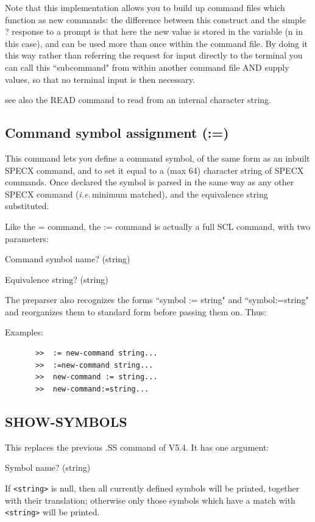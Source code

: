 \documentclass[11pt,twoside]{report}
\newcommand{\ie}{{\it i.e.\,}}
\begin{document}
Note that this implementation allows you to build up command files which
function as new commands: the difference between this construct and the simple
? response to a prompt is that here the new value is stored in the variable (n
in this case), and can be used more than once within the command file. By doing
it this way rather than referring the request for input directly to the
terminal you can call this ``subcommand" from within another command file AND
supply values, so that no terminal input is then necessary.

see also the READ command to read from an internal character string.
        
\subsection{Command symbol assignment (:=)}\index{:=}

This command lets you define a command symbol, of the same form as an inbuilt
SPECX command, and to set it equal to a (max 64) character string of SPECX
commands. Once declared the symbol is parsed in the same way as any other SPECX
command (\ie minimum matched), and the
equivalence string substituted. 

Like the = command, the := command is actually a full SCL command, with two
parameters:
\begin{description}
\item {Command symbol name?}  (string)
\item {Equivalence string?}   (string)
\end{description}
The preparser also recognizes the forms ``symbol :=
string" and ``symbol:=string" and reorganizes them to standard form before
passing them on. Thus: 

Examples:   
\begin{verbatim}
       >>  := new-command string...
       >>  :=new-command string...
       >>  new-command := string...
       >>  new-command:=string...
\end{verbatim}


\subsection{SHOW-SYMBOLS}

This replaces the previous .SS command of V5.4.
It has one argument: 
\begin{description}
\item  {Symbol name?}   (string)
\end{description}
If \verb+<string>+ is null, then all currently defined symbols will be printed,
together with their translation; otherwise only those symbols which have
a match with \verb+<string>+ will be printed.
\end{document}
